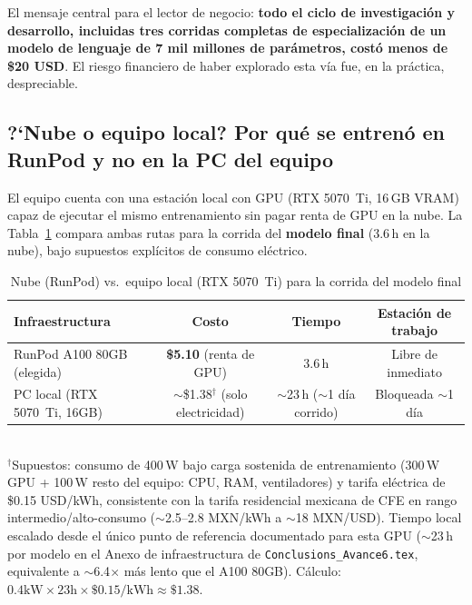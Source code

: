 \documentclass[11pt]{article}
\begin{document}
El mensaje central para el lector de negocio: \textbf{todo el ciclo de investigaci\'on y desarrollo, incluidas tres corridas completas de especializaci\'on de un modelo de lenguaje de 7 mil millones de par\'ametros, cost\'o menos de \$20 USD}. El riesgo financiero de haber explorado esta v\'ia fue, en la pr\'actica, despreciable.

\subsection{?`Nube o equipo local? Por qu\'e se entren\'o en RunPod y no en la PC del equipo}
\label{sec:cloud-vs-local}

El equipo cuenta con una estaci\'on local con GPU (RTX 5070~Ti, 16\,GB VRAM) capaz de ejecutar el mismo entrenamiento sin pagar renta de GPU en la nube. La Tabla~\ref{tab:cloud-vs-local} compara ambas rutas para la corrida del \textbf{modelo final} (3.6\,h en la nube), bajo supuestos expl\'icitos de consumo el\'ectrico.

\begin{table}[H]
\centering
\caption{Nube (RunPod) vs.\ equipo local (RTX 5070~Ti) para la corrida del modelo final}
\label{tab:cloud-vs-local}
\small
\begin{tabularx}{\linewidth}{Xccc}
\toprule
\textbf{Infraestructura} & \textbf{Costo} & \textbf{Tiempo} & \textbf{Estaci\'on de trabajo} \\
\midrule
RunPod A100 80GB (elegida) & \textbf{\$5.10} (renta de GPU) & 3.6\,h & Libre de inmediato \\
PC local (RTX 5070~Ti, 16GB) & $\sim$\$1.38$^\dagger$ (solo electricidad) & $\sim$23\,h ($\sim$1 d\'ia corrido) & Bloqueada $\sim$1 d\'ia \\
\bottomrule
\end{tabularx}
\\[0.3em]
{\scriptsize $^\dagger$Supuestos: consumo de 400\,W bajo carga sostenida de entrenamiento (300\,W GPU + 100\,W resto del equipo: CPU, RAM, ventiladores) y tarifa el\'ectrica de \$0.15 USD/kWh, consistente con la tarifa residencial mexicana de CFE en rango intermedio/alto-consumo ($\sim$2.5--2.8 MXN/kWh a $\sim$18 MXN/USD). Tiempo local escalado desde el \'unico punto de referencia documentado para esta GPU ($\sim$23\,h por modelo en el Anexo de infraestructura de \texttt{Conclusions\_Avance6.tex}, equivalente a $\sim$6.4$\times$ m\'as lento que el A100 80GB). C\'alculo: $0.4\text{kW} \times 23\text{h} \times \$0.15\text{/kWh} \approx \$1.38$.}
\end{table}
\end{document}
